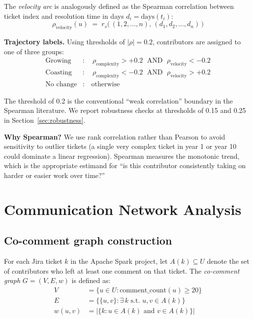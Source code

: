 \documentclass[12pt,a4paper]{article}
\begin{document}
The \textit{velocity arc} is analogously defined as the Spearman
correlation between ticket index and resolution time in days
$d_i = \text{days}(t_i)$:
\begin{equation}
  \rho_{\text{velocity}}(u) \;=\;
  r_s\bigl(\,(1,2,\ldots,n),\,(d_1, d_2, \ldots, d_n)\,\bigr)
  \label{eq:rho_velocity}
\end{equation}

\textbf{Trajectory labels.} Using thresholds of $|\rho| = 0.2$,
contributors are assigned to one of three groups:
\begin{align}
  \text{Growing}   &: \quad \rho_\text{complexity} > +0.2
    \;\text{ AND }\; \rho_\text{velocity} < -0.2 \label{eq:growing} \\
  \text{Coasting}  &: \quad \rho_\text{complexity} < -0.2
    \;\text{ AND }\; \rho_\text{velocity} > +0.2 \label{eq:coasting} \\
  \text{No change} &: \quad \text{otherwise} \label{eq:nochange}
\end{align}

The threshold of 0.2 is the conventional ``weak correlation''
boundary in the Spearman literature.
We report robustness checks at thresholds of 0.15 and 0.25 in
Section~\ref{sec:robustness}.

\textbf{Why Spearman?} We use rank correlation rather than
Pearson to avoid sensitivity to outlier tickets (a single
very complex ticket in year 1 or year 10 could dominate a
linear regression). Spearman measures the monotonic trend,
which is the appropriate estimand for ``is this contributor
consistently taking on harder or easier work over time?''

\section{Communication Network Analysis}

\subsection{Co-comment graph construction}

For each Jira ticket $k$ in the Apache Spark project, let
$A(k) \subseteq U$ denote the set of contributors who left at
least one comment on that ticket.
The \textit{co-comment graph} $G = (V, E, w)$ is defined as:
\begin{align}
  V &= \{u \in U : \text{comment\_count}(u) \geq 20\} \\
  E &= \bigl\{\{u,v\} : \exists\, k \text{ s.t. } u,v \in A(k)\bigr\} \\
  w(u,v) &= \bigl|\{k : u \in A(k) \text{ and } v \in A(k)\}\bigr|
\end{align}
\end{document}
